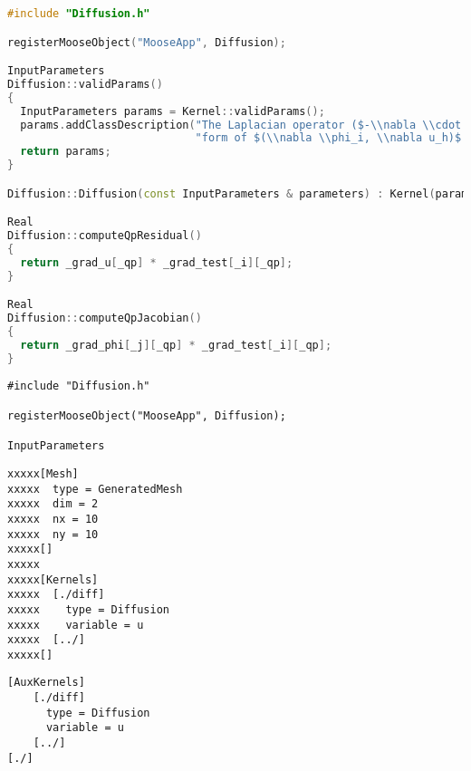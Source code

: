 \begin{lstlisting}[language=C++,]
#include "Diffusion.h"

registerMooseObject("MooseApp", Diffusion);

InputParameters
Diffusion::validParams()
{
  InputParameters params = Kernel::validParams();
  params.addClassDescription("The Laplacian operator ($-\\nabla \\cdot \\nabla u$), with the weak "
                             "form of $(\\nabla \\phi_i, \\nabla u_h)$.");
  return params;
}

Diffusion::Diffusion(const InputParameters & parameters) : Kernel(parameters) {}

Real
Diffusion::computeQpResidual()
{
  return _grad_u[_qp] * _grad_test[_i][_qp];
}

Real
Diffusion::computeQpJacobian()
{
  return _grad_phi[_j][_qp] * _grad_test[_i][_qp];
}
\end{lstlisting}

\begin{verbatim}
#include "Diffusion.h"

registerMooseObject("MooseApp", Diffusion);

InputParameters
\end{verbatim}

\begin{verbatim}
xxxxx[Mesh]
xxxxx  type = GeneratedMesh
xxxxx  dim = 2
xxxxx  nx = 10
xxxxx  ny = 10
xxxxx[]
xxxxx
xxxxx[Kernels]
xxxxx  [./diff]
xxxxx    type = Diffusion
xxxxx    variable = u
xxxxx  [../]
xxxxx[]
\end{verbatim}

\begin{verbatim}
[AuxKernels]
    [./diff]
      type = Diffusion
      variable = u
    [../]
[./]
\end{verbatim}
